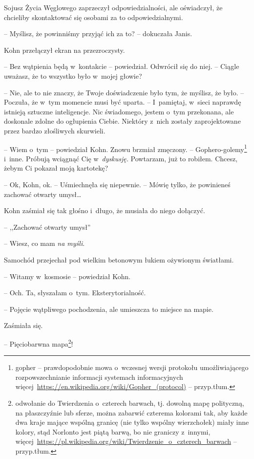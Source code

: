 \documentclass[oneside,polish,11pt,sfheadings]{mwbk}
\begin{document}
Sojusz Życia Węglowego zaprzeczył odpowiedzialności, ale oświadczył, że
chcieliby skontaktować się osobami za to odpowiedzialnymi.

-- Myślisz, że powinniśmy przyjąć ich za to? -- dokuczała Janis.

Kohn przełączył ekran na przezroczysty.

-- Bez wątpienia będą w~kontakcie -- powiedział. Odwrócił się do niej. -- Ciągle uważasz, że to wszystko było w~mojej głowie?

-- Nie, ale to nie znaczy, że Twoje doświadczenie było tym, że myślisz,
że było. -- Poczuła, że w~tym momencie musi być uparta. -- I~pamiętaj, w~sieci naprawdę istnieją sztuczne inteligencje. Nic świadomego, jestem o~tym przekonana, ale doskonale zdolne do ogłupienia Ciebie. Niektóry z~nich zostały zaprojektowane przez bardzo złośliwych skurwieli.

-- Wiem o~tym -- powiedział Kohn. Znowu brzmiał zmęczony. -- Gophero-golemy\footnote{gopher -- prawdopodobnie mowa o~wczesnej wersji
protokołu umożliwiającego rozpowszechnianie informacji systemach
informacyjnych
więcej~\url{https://en.wikipedia.org/wiki/Gopher\_(protocol)}
-- przyp.tłum.} i~inne. Próbują wciągnąć Cię w~\emph{dyskusję.}
Powtarzam, już to robiłem. Chcesz, żebym Ci pokazał moją kartotekę?

-- Ok, Kohn, ok. -- Uśmiechnęła się niepewnie. -- Mówię tylko, że
powinieneś zachować otwarty umysł\ldots

Kohn zaśmiał się tak głośno i~długo, że musiała do niego dołączyć.

-- ,,Zachować otwarty umysł''

-- Wiesz, co mam \emph{na myśli}.

Samochód przejechał pod wielkim betonowym łukiem ożywionym światłami.

-- Witamy w~kosmosie -- powiedział Kohn.

-- Och. Ta, słyszałam o~tym. Eksterytorialność.

-- Pojęcie wątpliwego pochodzenia, ale umieszcza to miejsce na mapie.

Zaśmiała się. 

-- Pięciobarwna mapa\footnote{odwołanie do Twierdzenia o~czterech barwach, tj. dowolną mapę polityczną, na płaszczyźnie lub
sferze, można zabarwić czterema kolorami tak, aby każde dwa kraje mające
wspólną granicę (nie tylko wspólny wierzchołek) miały inne kolory, stąd
Norlonto jest piątą barwą, bo nie graniczy z~innymi,
więcej~\url{https://pl.wikipedia.org/wiki/Twierdzenie\_o\_czterech\_barwach}
-- przyp.tłum.}! 
\end{document}
